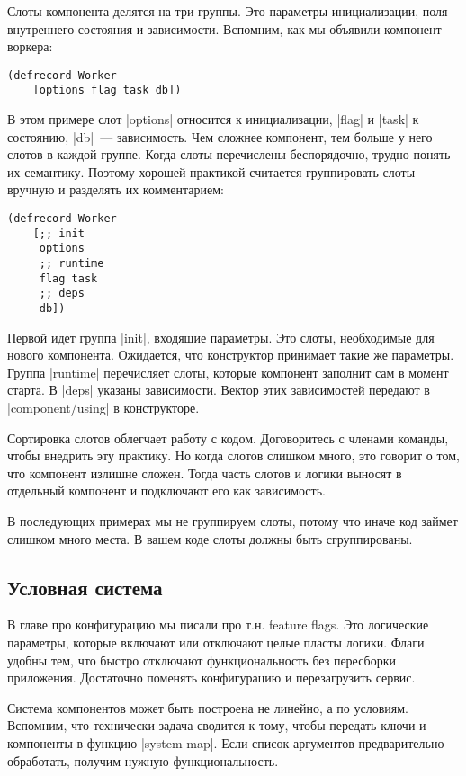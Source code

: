 Слоты компонента делятся на три группы. Это параметры инициализации, поля
внутреннего состояния и зависимости. Вспомним, как мы объявили компонент
воркера:

\begin{verbatim}
(defrecord Worker
    [options flag task db])
\end{verbatim}

В этом примере слот \spverb|options| относится к инициализации, \spverb|flag| и \spverb|task| к
состоянию, \spverb|db|~--- зависимость. Чем сложнее компонент, тем больше у него слотов в
каждой группе. Когда слоты перечислены беспорядочно, трудно понять их
семантику. Поэтому хорошей практикой считается группировать слоты вручную и
разделять их комментарием:

\begin{verbatim}
(defrecord Worker
    [;; init
     options
     ;; runtime
     flag task
     ;; deps
     db])
\end{verbatim}

Первой идет группа \spverb|init|, входящие параметры. Это слоты, необходимые для нового
компонента. Ожидается, что конструктор принимает такие же параметры. Группа
\spverb|runtime| перечисляет слоты, которые компонент заполнит сам в момент старта. В
\spverb|deps| указаны зависимости. Вектор этих зависимостей передают в
\spverb|component/using| в конструкторе.

Сортировка слотов облегчает работу с кодом. Договоритесь с членами команды,
чтобы внедрить эту практику. Но когда слотов слишком много, это говорит о том,
что компонент излишне сложен. Тогда часть слотов и логики выносят в отдельный
компонент и подключают его как зависимость.

В последующих примерах мы не группируем слоты, потому что иначе код займет
слишком много места. В вашем коде слоты должны быть сгруппированы.

\subsection{Условная система}

В главе про конфигурацию мы писали про т.н. feature flags. Это логические
параметры, которые включают или отключают целые пласты логики. Флаги удобны тем,
что быстро отключают функциональность без пересборки приложения. Достаточно
поменять конфигурацию и перезагрузить сервис.

Система компонентов может быть построена не линейно, а по условиям. Вспомним,
что технически задача сводится к тому, чтобы передать ключи и компоненты в
функцию \spverb|system-map|. Если список аргументов предварительно обработать, получим
нужную функциональность.

